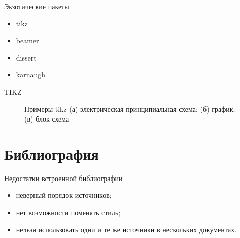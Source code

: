 \begin{frame}{Экзотические пакеты}
    \centering
    \begin{itemize}
        \pause\item tikz
        \pause\item beamer
        \pause\item dissert
        \pause\item karnaugh
    \end{itemize}
\end{frame}

\begin{frame}{TIKZ}
    \begin{figure}[!ht]
        
        Примеры tikz (а) электрическая принципиальная схема; (б) график; (в) блок-схема
    \end{figure}
\end{frame}

\section{Библиография}

\begin{frame}{Недостатки встроенной библиографии}
    \centering
    \begin{itemize}
        \pause\item неверный порядок источников;
        \pause\item нет возможности поменять стиль;
        \pause\item нельзя использовать одни и те же источники в нескольких документах.
    \end{itemize}
\end{frame}

